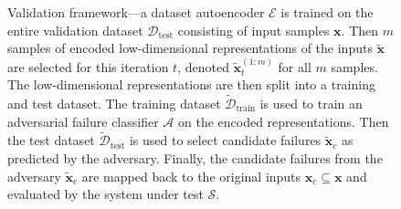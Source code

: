 \begin{figure}[t]
\centering
{}
\caption{Validation framework---a dataset autoencoder $\mathcal{E}$ is trained on the entire validation dataset $\mathcal{D}_\text{test}$ consisting of input samples $\mathbf{x}$. Then $m$ samples of encoded low-dimensional representations of the inputs $\tilde{\mathbf{x}}$ are selected for this iteration $t$, denoted $\tilde{\mathbf{x}}_t^{(1:m)}$ for all $m$ samples. The low-dimensional representations are then split into a training and test dataset. The training dataset $\tilde{\mathcal{D}}_\text{train}$ is used to train an adversarial failure classifier $\mathcal{A}$ on the encoded representations. Then the test dataset $\tilde{\mathcal{D}}_\text{test}$ is used to select candidate failures $\tilde{\mathbf{x}}_c$ as predicted by the adversary. Finally, the candidate failures from the adversary $\tilde{\mathbf{x}}_c$ are mapped back to the original inputs $\mathbf{x}_c \subseteq \mathbf{x}$ and evaluated by the system under test $\mathcal{S}$.}
\label{fig:framework}
\end{figure}


